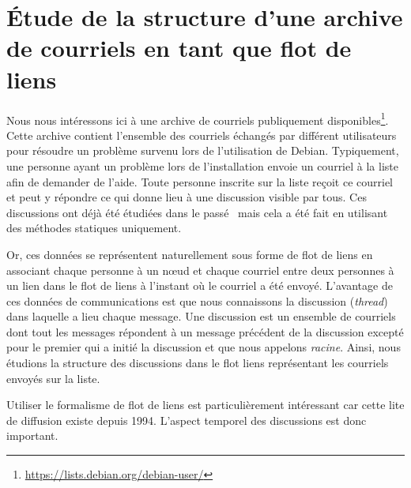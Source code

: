 

\chapter{Étude de la structure d'une archive de courriels en tant que flot de liens}
\minitoc

\label{chap:mailing}


Nous nous intéressons ici à une archive de courriels publiquement disponibles\footnote{\url{https://lists.debian.org/debian-user/}}.
Cette archive contient l'ensemble des courriels échangés par différent utilisateurs pour résoudre un problème survenu lors de l'utilisation de Debian.
Typiquement, une personne ayant un problème lors de l'installation envoie un courriel à la liste afin de demander de l'aide.
Toute personne inscrite sur la liste reçoit ce courriel et peut y répondre ce qui donne lieu à une discussion visible par tous.
Ces discussions ont déjà été étudiées dans le passé~\cite{dorat2007,sowe2006,wang2014} mais cela a été fait en utilisant des méthodes statiques uniquement.

Or, ces données se représentent naturellement sous forme de flot de liens en associant chaque personne à un n\oe ud et chaque courriel entre deux personnes à un lien dans le flot de liens à l'instant où le courriel a été envoyé.
L'avantage de ces données de communications est que nous connaissons la discussion (\emph{thread}) dans laquelle a lieu chaque message.
Une discussion est un ensemble de courriels dont tout les messages répondent à un message précédent de la discussion excepté pour le premier qui a initié la discussion et que nous appelons \emph{racine}.
Ainsi, nous étudions la structure des discussions dans le flot liens représentant les courriels envoyés sur la liste.

Utiliser le formalisme de flot de liens est particulièrement intéressant car cette lite de diffusion existe depuis 1994.
L'aspect temporel des discussions est donc important.



